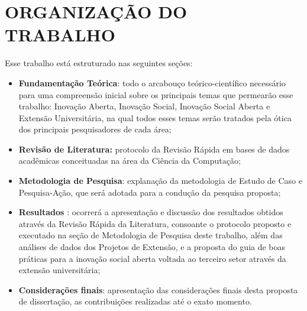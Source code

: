 \section{ORGANIZAÇÃO DO TRABALHO}
\label{organizacao}

Esse trabalho está estruturado nas seguintes seções:
\par\vspace{1\baselineskip}

\begin{itemize}
    \item \textbf{Fundamentação Teórica}: todo o arcabouço teórico-científico necessário para uma compreensão inicial sobre os principais temas que permearão esse trabalho: Inovação Aberta, Inovação Social, Inovação Social Aberta e Extensão Universitária, na qual todos esses temas serão tratados pela ótica dos principais pesquisadores de cada área;
    \item\textbf{Revisão de Literatura:} protocolo da Revisão Rápida em bases de dados acadêmicas conceituadas na área da Ciência da Computação;
    \item \textbf{Metodologia de Pesquisa}: explanação da metodologia de Estudo de Caso e Pesquisa-Ação, que será adotada para a condução da pesquisa proposta;
    \item \textbf{Resultados }: ocorrerá a apresentação e discussão dos resultados obtidos através da Revisão Rápida da Literatura, consoante o protocolo proposto e executado na seção de Metodologia de Pesquisa deste trabalho, além das análises de dados dos Projetos de Extensão, e a proposta do guia de boas práticas para a inovação social aberta voltada ao terceiro setor através da extensão universitária;
    \item \textbf{Considerações finais}: apresentação das considerações finais desta proposta de dissertação, as contribuições realizadas até o exato momento.

\end{itemize}






